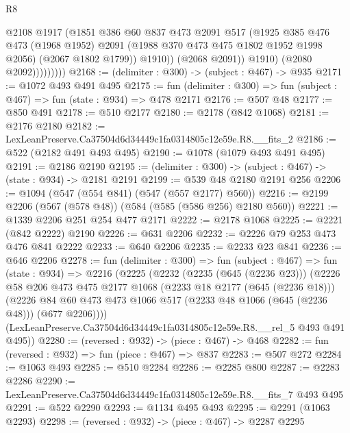 \begin{lexlean}{R8}
\begin{coremodule}
                          @2108
                          @1917
                          (@1851
                            @386
                            @60
                            @837
                            @473
                            @2091
                            @517
                            (@1925
                              @385
                              @476
                              @473
                              (@1968 @1952)
                              @2091
                              (@1988 @370 @473 @475 @1802 @1952 @1998 @2056)
                              (@2067 @1802 @1799))
                            @1910))
                        (@2068 @2091))
                      @1910)
                    (@2080 @2092)))))))))
@2168 := (delimiter : @300) -> (subject : @467) -> @935
@2171 := @1072 @493 @491 @495
@2175 := fun (delimiter : @300) => fun (subject : @467) => fun (state : @934) => @478 @2171
@2176 := @507 @48
@2177 := @850 @491
@2178 := @510 @2177
@2180 := @2178 (@842 @1068)
@2181 := @2176 @2180
@2182 := LexLeanPreserve.Ca37504d6d34449c1fa0314805c12e59e.R8.__fits_2
@2186 := @522 (@2182 @491 @493 @495)
@2190 := @1078 (@1079 @493 @491 @495)
@2191 := @2186 @2190
@2195 := (delimiter : @300) -> (subject : @467) -> (state : @934) -> @2181 @2191
@2199 := @539 @48 @2180 @2191 @256
@2206 := @1094 (@547 (@554 @841) (@547 (@557 @2177) @560))
@2216 := @2199 @2206 (@567 (@578 @48)) (@584 (@585 (@586 @256) @2180 @560))
@2221 := @1339 @2206 @251 @254 @477 @2171
@2222 := @2178 @1068
@2225 := @2221 (@842 @2222) @2190
@2226 := @631 @2206
@2232 := @2226 @79 @253 @473 @476 @841 @2222
@2233 := @640 @2206
@2235 := @2233 @23 @841
@2236 := @646 @2206
@2278 := fun (delimiter : @300) =>
  fun (subject : @467) =>
  fun (state : @934) =>
  @2216
    (@2225
      (@2232
        (@2235 (@645 (@2236 @23)))
        (@2226
          @58
          @206
          @473
          @475
          @2177
          @1068
          (@2233 @18 @2177 (@645 (@2236 @18)))
          (@2226 @84 @60 @473 @473 @1066 @517 (@2233 @48 @1066 (@645 (@2236 @48))) (@677 @2206))))
      (LexLeanPreserve.Ca37504d6d34449c1fa0314805c12e59e.R8.__rel_5 @493 @491 @495))
@2280 := (reversed : @932) -> (piece : @467) -> @468
@2282 := fun (reversed : @932) => fun (piece : @467) => @837
@2283 := @507 @272
@2284 := @1063 @493
@2285 := @510 @2284
@2286 := @2285 @800
@2287 := @2283 @2286
@2290 := LexLeanPreserve.Ca37504d6d34449c1fa0314805c12e59e.R8.__fits_7 @493 @495
@2291 := @522 @2290
@2293 := @1134 @495 @493
@2295 := @2291 (@1063 @2293)
@2298 := (reversed : @932) -> (piece : @467) -> @2287 @2295

\end{coremodule}
\end{lexlean}

